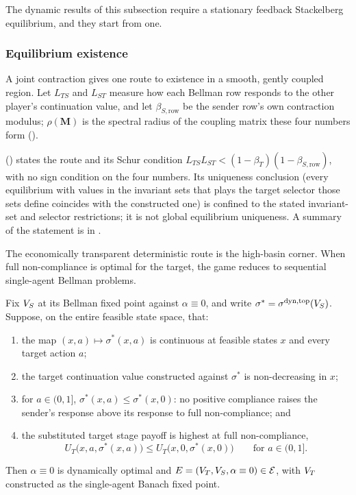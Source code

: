 The dynamic results of this subsection require a stationary feedback
Stackelberg equilibrium, and they start from one.

\subsubsection{Equilibrium existence}

A joint contraction gives one route to existence in a smooth,
gently coupled region. Let $L_{TS}$ and $L_{ST}$ measure how each
Bellman row responds to the other player's continuation value, and let
$\beta_{S,\mathrm{row}}$ be the sender row's own contraction modulus;
$\rho(\mathbf M)$ is the spectral radius of the coupling matrix these
four numbers form ().

 () states the route and its
Schur condition $L_{TS}L_{ST}<(1-\beta_T)(1-\beta_{S,\mathrm{row}})$, with no
sign condition on the four numbers. Its uniqueness conclusion (every
equilibrium with values in the invariant sets that plays the target selector those sets define
coincides with the constructed one) is confined to the stated invariant-set and
selector restrictions; it is not global equilibrium uniqueness. A summary of the
statement is in .

The economically transparent deterministic route is the high-basin
corner. When full non-compliance is optimal for the target, the game reduces
to sequential single-agent Bellman problems.

\begin{theorem}
\label{thm:corner-existence}
Fix $V_S$ at its Bellman fixed point against $\alpha\equiv0$, and
write $\sigma^\ast=\sigma^{\mathrm{dyn,top}}(V_S)$. Suppose, on the
entire feasible state space, that:
\begin{enumerate}[label=(\roman*)]
\item the map $(x,a)\mapsto\sigma^\ast(x,a)$ is continuous at feasible
states $x$ and every target action $a$;
\item the target continuation value constructed against
$\sigma^\ast$ is non-decreasing in $x$;
\item for $a\in(0,1]$, $\sigma^\ast(x,a)\le\sigma^\ast(x,0)$: no positive
compliance raises the sender's response above its response to full
non-compliance; and
\item the substituted target stage payoff is highest at full non-compliance,
\[
U_T\!\bigl(x,a,\sigma^\ast(x,a)\bigr)
\le
U_T\!\bigl(x,0,\sigma^\ast(x,0)\bigr)
\qquad\text{for }a\in(0,1].
\]
\end{enumerate}
Then $\alpha\equiv0$ is dynamically optimal and
$E=(V_T,V_S,\alpha\equiv0)\in\mathcal E$, with $V_T$ constructed as
the single-agent Banach fixed point.
\end{theorem}

